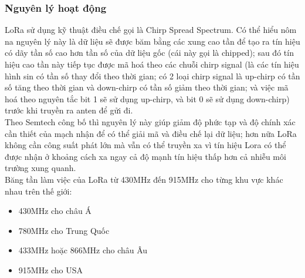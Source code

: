 \subsubsection{Nguyên lý hoạt động}
LoRa sử dụng kỹ thuật điều chế gọi là Chirp Spread Spectrum. Có thể hiểu nôm na nguyên lý này là dữ liệu sẽ được băm bằng các xung cao tần để tạo ra tín hiệu có dãy tần số cao hơn tần số của dữ liệu gốc (cái này gọi là chipped); sau đó tín hiệu cao tần này tiếp tục được mã hoá theo các chuỗi chirp signal (là các tín hiệu hình sin có tần số thay đổi theo thời gian; có 2 loại chirp signal là up-chirp có tần số tăng theo thời gian và down-chirp có tần số giảm theo thời gian; và việc mã hoá theo nguyên tắc bit 1 sẽ sử dụng up-chirp, và bit 0 sẽ sử dụng down-chirp) trước khi truyền ra anten để gửi đi.\\
\indent Theo Semtech công bố thì nguyên lý này giúp giảm độ phức tạp và độ chính xác cần thiết của mạch nhận để có thể giải mã và điều chế lại dữ liệu; hơn nữa LoRa không cần công suất phát lớn mà vẫn có thể truyền xa vì tín hiệu Lora có thể được nhận ở khoảng cách xa ngay cả độ mạnh tín hiệu thấp hơn cả nhiễu môi trường xung quanh.\\
\indent Băng tần làm việc của LoRa từ 430MHz đến 915MHz cho từng khu vực khác nhau trên thế giới:
\begin{itemize}
	\item 430MHz cho châu Á
	\item 780MHz cho Trung Quốc
	\item 433MHz hoặc 866MHz cho châu Âu
	\item 915MHz cho USA
\end{itemize}

